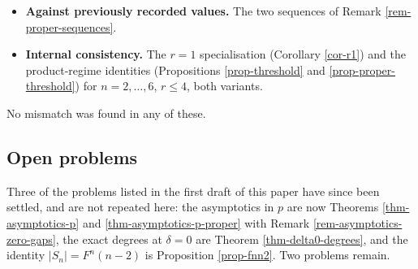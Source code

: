 \documentclass[11pt, a4paper, abstract=yes]{scrartcl}
\theoremstyle{definition}
\theoremstyle{remark}
\theoremstyle{plain}
\begin{document}
\begin{itemize}
\textbf{What ``Perron root'' is not.} Perron--Frobenius theory is not available in the library used. Of
Proposition \ref{prop-perron-threshold} what is certified is therefore the eigenvalue statement, for
both roots: above its threshold each of \(T_n(\delta)\) and \(T'_n(\delta)\) has rank one, the vector
\(\vec 1_n\) is an eigenvector with eigenvalue \(\lvert\mathcal F_n\rvert\) and
\(\lvert S_n\rvert\) respectively, and no other eigenvalue is non-zero. What is not certified is
the word \textbf{Perron},
that this is the eigenvalue of largest modulus with a non-negative eigenvector, and in the
rank-one case the gap is only the comparison against \(0\), but it is a gap. The same limitation
leaves the growth claim of Proposition \ref{prop-recurrence} outside, and there, unlike here, no
degeneracy makes the gap small. That proposition's other half \textbf{is} certified: the linear recurrence
follows from the Cayley--Hamilton theorem, needs no spectral theory at all, and holds for both
matrices unconditionally.

The formalisation turned up two kinds of thing. Several of the strengthenings recorded above were
found here, each of them a hypothesis that turned out to be unnecessary; and one hypothesis turned
out to be \textbf{missing}, namely Theorem \ref{thm-proper}'s \(n\ge1\), without which the statement is
false at \(n=0\), where \(A'_n\) vanishes identically while
\(\lvert\mathrm{FF}_{\mathrm{pr}}(0;\vec d\,)\rvert=1\).

\item \textbf{Against previously recorded values.} The two sequences of Remark \ref{rem-proper-sequences}.
\item \textbf{Internal consistency.} The \(r=1\) specialisation (Corollary \ref{cor-r1}) and the product-regime
identities (Propositions \ref{prop-threshold} and \ref{prop-proper-threshold}) for \(n=2,\dots,6\),
\(r\le4\), both variants.
\end{itemize}

No mismatch was found in any of these.
\subsection{Open problems}
\label{sec:org4b15584}

Three of the problems listed in the first draft of this paper have since been settled, and are not
repeated here: the asymptotics in \(p\) are now Theorems \ref{thm-asymptotics-p}
and \ref{thm-asymptotics-p-proper} with Remark \ref{rem-asymptotics-zero-gaps}, the exact degrees at
\(\delta=0\) are Theorem \ref{thm-delta0-degrees}, and the identity \(\lvert S_n\rvert=F^n(n-2)\)
is Proposition \ref{prop-fnn2}. Two problems remain.
\end{document}
